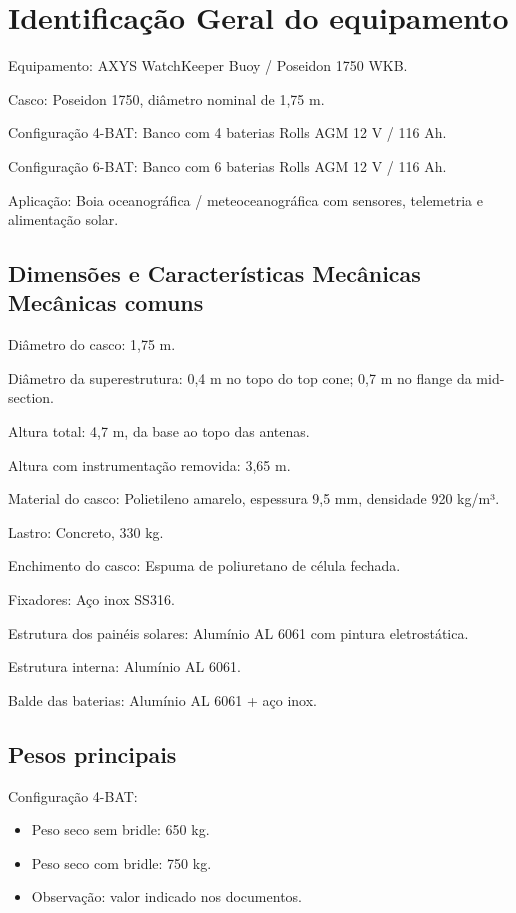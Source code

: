 \documentclass[a4paper,12pt]{article}
\begin{document}
\section{Identificação Geral do equipamento}

Equipamento:
AXYS WatchKeeper Buoy / Poseidon 1750 WKB.

Casco:
Poseidon 1750, diâmetro nominal de 1,75 m.

Configuração 4-BAT:
Banco com 4 baterias Rolls AGM 12 V / 116 Ah.

Configuração 6-BAT:
Banco com 6 baterias Rolls AGM 12 V / 116 Ah.

Aplicação:
Boia oceanográfica / meteoceanográfica com sensores, telemetria e alimentação solar.


\subsection{Dimensões e Características Mecânicas Mecânicas comuns}

Diâmetro do casco:
1,75 m.

Diâmetro da superestrutura:
0,4 m no topo do top cone; 0,7 m no flange da mid-section.

Altura total:
4,7 m, da base ao topo das antenas.

Altura com instrumentação removida:
3,65 m.

Material do casco:
Polietileno amarelo, espessura 9,5 mm, densidade 920 kg/m³.

Lastro:
Concreto, 330 kg.

Enchimento do casco:
Espuma de poliuretano de célula fechada.

Fixadores:
Aço inox SS316.

Estrutura dos painéis solares:
Alumínio AL 6061 com pintura eletrostática.

Estrutura interna:
Alumínio AL 6061.

Balde das baterias:
Alumínio AL 6061 + aço inox.

\subsection{Pesos principais}

Configuração 4-BAT:
\begin{itemize}
  \item Peso seco sem bridle: 650 kg.
  \item Peso seco com bridle: 750 kg. 
  \item Observação: valor indicado nos documentos.
\end{itemize}
\end{document}
